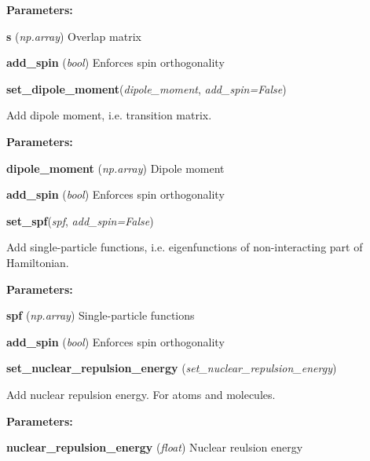 \begin{tcolorbox}
{\begin{adjustwidth}{4em}{}
        \textbf{Parameters:}

        \hspace{1.5em} \textbf{s} (\emph{np.array}) Overlap matrix

        \hspace{1.5em} \textbf{add\_spin} (\emph{bool}) Enforces spin orthogonality

    \end{adjustwidth}   

    \hspace{2em} \textbf{set\_dipole\_moment}(\emph{dipole\_moment}, \emph{add\_spin=False})
    \begin{adjustwidth}{4em}{}
        Add dipole moment, i.e. transition matrix.

        \textbf{Parameters:}

        \hspace{1.5em} \textbf{dipole\_moment} (\emph{np.array}) Dipole moment

        \hspace{1.5em} \textbf{add\_spin} (\emph{bool}) Enforces spin orthogonality

    \end{adjustwidth}

    \hspace{2em} \textbf{set\_spf}(\emph{spf}, \emph{add\_spin=False})
    \begin{adjustwidth}{4em}{}
        Add single-particle functions, i.e. eigenfunctions of non-interacting 
        part of Hamiltonian.

        \textbf{Parameters:}

        \hspace{1.5em} \textbf{spf} (\emph{np.array}) Single-particle functions

        \hspace{1.5em} \textbf{add\_spin} (\emph{bool}) Enforces spin orthogonality

    \end{adjustwidth}

    \hspace{2em} \textbf{set\_nuclear\_repulsion\_energy}
        (\emph{set\_nuclear\_repulsion\_energy})
    \begin{adjustwidth}{4em}{}
        Add nuclear repulsion energy. For atoms and molecules.

        \textbf{Parameters:}

        \hspace{1.5em} \textbf{nuclear\_repulsion\_energy} 
            (\emph{float}) Nuclear reulsion energy 

    \end{adjustwidth}


    }
\end{tcolorbox}